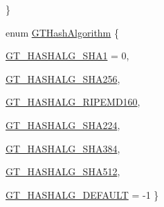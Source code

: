 \begin{DoxyCompactItemize}
 \}
\item 
enum \hyperlink{group__common_ga5110e02245c37b4ff48ea4c4efb2924a}{GTHashAlgorithm} \{ \par
\hyperlink{group__common_gga5110e02245c37b4ff48ea4c4efb2924aacf228534e6197f397844e3df570ab4ac}{GT\_\-HASHALG\_\-SHA1} =  0, 
\par
\hyperlink{group__common_gga5110e02245c37b4ff48ea4c4efb2924aae10bc68e67a18f73f0c5f8f8efceefee}{GT\_\-HASHALG\_\-SHA256}, 
\par
\hyperlink{group__common_gga5110e02245c37b4ff48ea4c4efb2924aa5549aedec095a5198f18053b29a0a076}{GT\_\-HASHALG\_\-RIPEMD160}, 
\par
\hyperlink{group__common_gga5110e02245c37b4ff48ea4c4efb2924aa13fec9f022128da24b256438e5d4ebdb}{GT\_\-HASHALG\_\-SHA224}, 
\par
\hyperlink{group__common_gga5110e02245c37b4ff48ea4c4efb2924aa37c70805117fe51e381f1909743be4fc}{GT\_\-HASHALG\_\-SHA384}, 
\par
\hyperlink{group__common_gga5110e02245c37b4ff48ea4c4efb2924aaeac44b28ef0ce297740ab418e3b484e4}{GT\_\-HASHALG\_\-SHA512}, 
\par
\hyperlink{group__common_gga5110e02245c37b4ff48ea4c4efb2924aab9f938a3bcdd62e6732ea0b7221e10fd}{GT\_\-HASHALG\_\-DEFAULT} =  -\/1
 \}
\end{DoxyCompactItemize}
